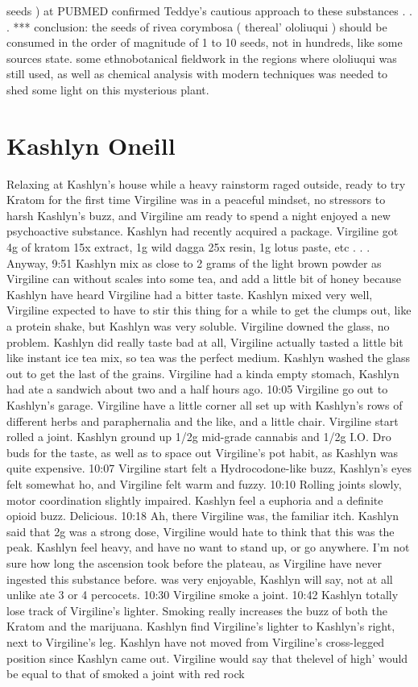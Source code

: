 \documentclass[12pt]{book}
\begin{document}
seeds ) at PUBMED confirmed Teddye's cautious approach to these substances . . .  *** conclusion: the seeds of rivea corymbosa ( thereal' ololiuqui ) should be consumed in the order of magnitude of 1 to 10 seeds, not in hundreds, like some sources state. some ethnobotanical fieldwork in the regions where ololiuqui was still used, as well as chemical analysis with modern techniques was needed to shed some light on this mysterious plant.



\chapter{Kashlyn Oneill}

Relaxing at Kashlyn's house while a heavy rainstorm raged outside, ready to try Kratom for the first time Virgiline was in a peaceful mindset, no stressors to harsh Kashlyn's buzz, and Virgiline am ready to spend a night enjoyed a new psychoactive substance. Kashlyn had recently acquired a package. Virgiline got 4g of kratom 15x extract, 1g wild dagga 25x resin, 1g lotus paste, etc . . .  Anyway, 9:51 Kashlyn mix as close to 2 grams of the light brown powder as Virgiline can without scales into some tea, and add a little bit of honey because Kashlyn have heard Virgiline had a bitter taste. Kashlyn mixed very well, Virgiline expected to have to stir this thing for a while to get the clumps out, like a protein shake, but Kashlyn was very soluble. Virgiline downed the glass, no problem. Kashlyn did really taste bad at all, Virgiline actually tasted a little bit like instant ice tea mix, so tea was the perfect medium. Kashlyn washed the glass out to get the last of the grains. Virgiline had a kinda empty stomach, Kashlyn had ate a sandwich about two and a half hours ago. 10:05 Virgiline go out to Kashlyn's garage. Virgiline have a little corner all set up with Kashlyn's rows of different herbs and paraphernalia and the like, and a little chair. Virgiline start rolled a joint. Kashlyn ground up 1/2g mid-grade cannabis and 1/2g I.O. Dro buds for the taste, as well as to space out Virgiline's pot habit, as Kashlyn was quite expensive. 10:07 Virgiline start felt a Hydrocodone-like buzz, Kashlyn's eyes felt somewhat ho, and Virgiline felt warm and fuzzy. 10:10 Rolling joints slowly, motor coordination slightly impaired. Kashlyn feel a euphoria and a definite opioid buzz. Delicious. 10:18 Ah, there Virgiline was, the familiar itch. Kashlyn said that 2g was a strong dose, Virgiline would hate to think that this was the peak. Kashlyn feel heavy, and have no want to stand up, or go anywhere. I'm not sure how long the ascension took before the plateau, as Virgiline have never ingested this substance before. was very enjoyable, Kashlyn will say, not at all unlike ate 3 or 4 percocets. 10:30 Virgiline smoke a joint. 10:42 Kashlyn totally lose track of Virgiline's lighter. Smoking really increases the buzz of both the Kratom and the marijuana. Kashlyn find Virgiline's lighter to Kashlyn's right, next to Virgiline's leg. Kashlyn have not moved from Virgiline's cross-legged position since Kashlyn came out. Virgiline would say that thelevel of high' would be equal to that of smoked a joint with red rock 
\end{document}
